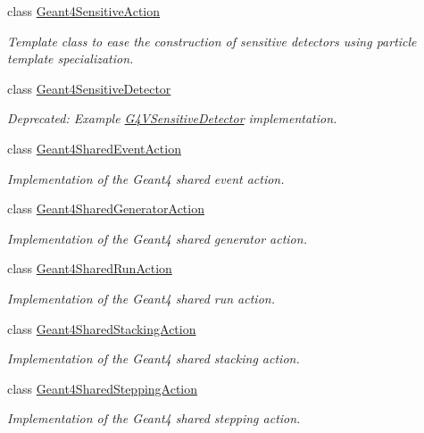 \begin{DoxyCompactItemize}
class \hyperlink{class_d_d4hep_1_1_simulation_1_1_geant4_sensitive_action}{Geant4\+Sensitive\+Action}
\begin{DoxyCompactList}\small\item\em Template class to ease the construction of sensitive detectors using particle template specialization. \end{DoxyCompactList}\item 
class \hyperlink{class_d_d4hep_1_1_simulation_1_1_geant4_sensitive_detector}{Geant4\+Sensitive\+Detector}
\begin{DoxyCompactList}\small\item\em Deprecated\+: Example \hyperlink{class_g4_v_sensitive_detector}{G4\+V\+Sensitive\+Detector} implementation. \end{DoxyCompactList}\item 
class \hyperlink{class_d_d4hep_1_1_simulation_1_1_geant4_shared_event_action}{Geant4\+Shared\+Event\+Action}
\begin{DoxyCompactList}\small\item\em Implementation of the Geant4 shared event action. \end{DoxyCompactList}\item 
class \hyperlink{class_d_d4hep_1_1_simulation_1_1_geant4_shared_generator_action}{Geant4\+Shared\+Generator\+Action}
\begin{DoxyCompactList}\small\item\em Implementation of the Geant4 shared generator action. \end{DoxyCompactList}\item 
class \hyperlink{class_d_d4hep_1_1_simulation_1_1_geant4_shared_run_action}{Geant4\+Shared\+Run\+Action}
\begin{DoxyCompactList}\small\item\em Implementation of the Geant4 shared run action. \end{DoxyCompactList}\item 
class \hyperlink{class_d_d4hep_1_1_simulation_1_1_geant4_shared_stacking_action}{Geant4\+Shared\+Stacking\+Action}
\begin{DoxyCompactList}\small\item\em Implementation of the Geant4 shared stacking action. \end{DoxyCompactList}\item 
class \hyperlink{class_d_d4hep_1_1_simulation_1_1_geant4_shared_stepping_action}{Geant4\+Shared\+Stepping\+Action}
\begin{DoxyCompactList}\small\item\em Implementation of the Geant4 shared stepping action. \end{DoxyCompactList}\item 

\end{DoxyCompactItemize}
